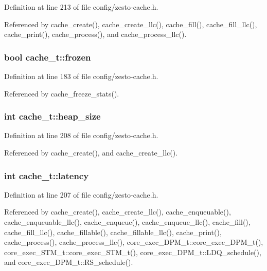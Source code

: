 Definition at line 213 of file config/zesto-cache.h.

Referenced by cache\_\-create(), cache\_\-create\_\-llc(), cache\_\-fill(), cache\_\-fill\_\-llc(), cache\_\-print(), cache\_\-process(), and cache\_\-process\_\-llc().
\subsubsection[{frozen}]{\setlength{\rightskip}{0pt plus 5cm}bool {\bf cache\_\-t::frozen}}\label{structcache__t_b67b8cc10dbf84f896fd5fcc714d0600}




Definition at line 183 of file config/zesto-cache.h.

Referenced by cache\_\-freeze\_\-stats().
\subsubsection[{heap\_\-size}]{\setlength{\rightskip}{0pt plus 5cm}int {\bf cache\_\-t::heap\_\-size}}\label{structcache__t_0cfeed47b284a9b6bcc5222bcf4e29ae}




Definition at line 208 of file config/zesto-cache.h.

Referenced by cache\_\-create(), and cache\_\-create\_\-llc().
\subsubsection[{latency}]{\setlength{\rightskip}{0pt plus 5cm}int {\bf cache\_\-t::latency}}\label{structcache__t_85aa054d657c7a242147602cb1fff479}




Definition at line 207 of file config/zesto-cache.h.

Referenced by cache\_\-create(), cache\_\-create\_\-llc(), cache\_\-enqueuable(), cache\_\-enqueuable\_\-llc(), cache\_\-enqueue(), cache\_\-enqueue\_\-llc(), cache\_\-fill(), cache\_\-fill\_\-llc(), cache\_\-fillable(), cache\_\-fillable\_\-llc(), cache\_\-print(), cache\_\-process(), cache\_\-process\_\-llc(), core\_\-exec\_\-DPM\_\-t::core\_\-exec\_\-DPM\_\-t(), core\_\-exec\_\-STM\_\-t::core\_\-exec\_\-STM\_\-t(), core\_\-exec\_\-DPM\_\-t::LDQ\_\-schedule(), and core\_\-exec\_\-DPM\_\-t::RS\_\-schedule().
